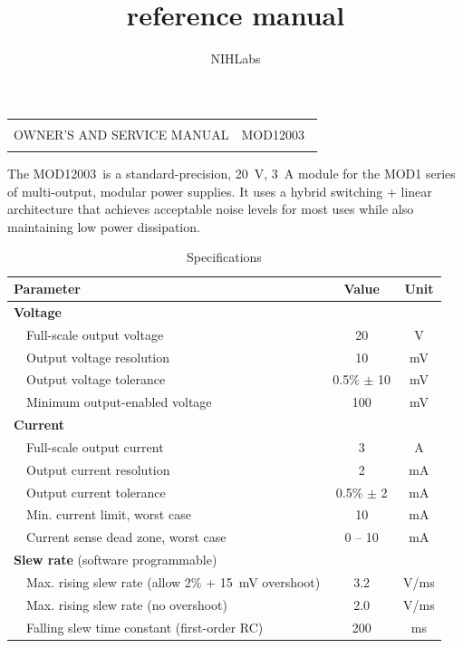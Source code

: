 \documentclass[letterpaper,twocolumn,10pt,openany,oneside,final,fleqn]{memoir}
\title{\Model reference manual}
\author{NIHLabs}
\newcommand{\Model}{MOD12003\ }
\begin{document}
\frontmatter

\onecolumn
\begin{titlingpage}
\begin{tabularx}{\textwidth}{Xr}
\hline
\\
{\LARGE OWNER'S AND SERVICE MANUAL} &
\Model \\
\\
\hline
\end{tabularx}
\vfill
\begin{center}
    The \Model is a standard-precision, \SI{20}{V}, \SI{3}{A} module for the
    MOD1 series of multi-output, modular power supplies. It uses a hybrid
    switching + linear architecture that achieves acceptable noise levels for
    most uses while also maintaining low power dissipation.
\end{center}
\vfill
\begin{table}[h]
\centering
\caption{Specifications}
\begin{tabular}{p{2mm}lcc}
    \toprule
    \multicolumn{2}{l}{\textbf{Parameter}} & \textbf{Value} & \textbf{Unit} \\ \midrule
    \multicolumn{2}{l}{\textbf{Voltage}} & & \\ \midrule
    & Full-scale output voltage & 20 & V \\
    & Output voltage resolution & 10 & mV \\
    & Output voltage tolerance  & 0.5\% $\pm$ 10 & mV \\
    & Minimum output-enabled voltage & 100 & mV \\
    \midrule
    \multicolumn{2}{l}{\textbf{Current}} & & \\ \midrule
    & Full-scale output current & 3 & A  \\
    & Output current resolution & 2 & mA \\
    & Output current tolerance  & 0.5\% $\pm$ 2 & mA \\
    & Min. current limit, worst case & 10 & mA \\
    & Current sense dead zone, worst case   & 0 -- 10 & mA \\
    \midrule
    \multicolumn{2}{l}{\textbf{Slew rate} (software programmable)} & & \\ \midrule
    & Max. rising slew rate (allow 2\% + \SI{15}{mV} overshoot) & 3.2 & V/ms \\
    & Max. rising slew rate (no overshoot) & 2.0 & V/ms \\
    & Falling slew time constant (first-order RC) & 200 & ms \\

\end{tabular}
\end{table}
\end{titlingpage}
\end{document}
